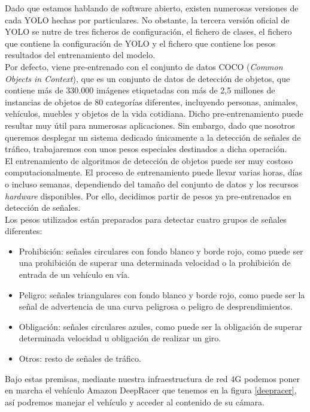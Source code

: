 Dado que estamos hablando de software abierto, existen numerosas versiones de cada YOLO hechas por particulares. No obstante, la tercera versión oficial de YOLO se nutre de tres ficheros de configuración, el fichero de clases, el fichero que contiene la configuración de YOLO y el fichero que contiene los pesos resultados del entrenamiento del modelo.\\

Por defecto, viene pre-entrenado con el conjunto de datos COCO (\textit{Common Objects in Context}), que es un conjunto de datos de detección de objetos, que contiene más de 330.000 imágenes etiquetadas con más de 2,5 millones de instancias de objetos de 80 categorías diferentes, incluyendo personas, animales, vehículos, muebles y objetos de la vida cotidiana. Dicho pre-entrenamiento puede resultar muy útil para numerosas aplicaciones. Sin embargo, dado que nosotros queremos desplegar un sistema dedicado únicamente a la detección de señales de tráfico, trabajaremos con unos pesos especiales destinados a dicha operación.\\

El entrenamiento de algoritmos de detección de objetos puede ser muy costoso computacionalmente. El proceso de entrenamiento puede llevar varias horas, días o incluso semanas, dependiendo del tamaño del conjunto de datos y los recursos \textit{hardware} disponibles. Por ello, decidimos partir de pesos ya pre-entrenados en detección de señales.\\

Los pesos utilizados están preparados para detectar cuatro grupos de señales diferentes:\\
\begin{itemize}
\item Prohibición: señales circulares con fondo blanco y borde rojo, como puede ser una prohibición de superar una determinada velocidad o la prohibición de entrada de un vehículo en vía.
\item Peligro: señales triangulares con fondo blanco y borde rojo, como puede ser la señal de advertencia de una curva peligrosa o peligro de desprendimientos.
\item Obligación: señales circulares azules, como puede ser la obligación de superar determinada velocidad u obligación de realizar un giro.
\item Otros: resto de señales de tráfico.
\end{itemize}

Bajo estas premisas, mediante nuestra infraestructura de red 4G podemos poner en marcha el vehículo Amazon DeepRacer que tenemos en la figura \ref{deepracer}, así podremos manejar el vehículo y acceder al contenido de su cámara.\\

